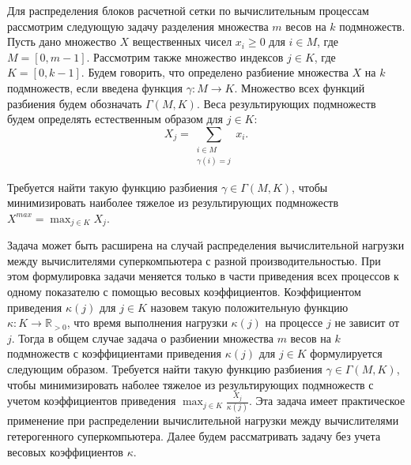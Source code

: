 Для распределения блоков расчетной сетки по вычислительным процессам рассмотрим следующую задачу разделения множества $m$ весов на $k$ подмножеств.
Пусть дано множество $X$ вещественных чисел $x_i \ge 0$ для $i \in M$, где $M = [0, m - 1]$.
Рассмотрим также множество индексов $j \in K$, где $K = [0, k - 1]$.
Будем говорить, что определено разбиение множества $X$ на $k$ подмножеств, если введена функция $\gamma: M \rightarrow K$.
Множество всех функций разбиения будем обозначать $\Gamma(M, K)$.
Веса результирующих подмножеств будем определять естественным образом для $j \in K$:
\begin{equation}
	X_j = \sum_{\substack{i \in M \\ \gamma(i) = j}}{x_i}.
\end{equation}

Требуется найти такую функцию разбиения $\gamma \in \Gamma(M, K)$, чтобы минимизировать наиболее тяжелое из результирующих подмножеств $X^{max} = \max_{j \in K}{X_j}$.

Задача может быть расширена на случай распределения вычислительной нагрузки между вычислителями суперкомпьютера с разной производительностью.
При этом формулировка задачи меняется только в части приведения всех процессов к одному показателю с помощью весовых коэффициентов.
Коэффициентом приведения $\kappa(j)$ для $j \in K$ назовем такую положительную функцию $\kappa: K \rightarrow \mathbb{R}_{>0}$, что время выполнения нагрузки $\kappa(j)$ на процессе $j$ не зависит от $j$.
Тогда в общем случае задача о разбиении множества $m$ весов на $k$ подмножеств с коэффициентами приведения $\kappa(j)$ для $j \in K$ формулируется следующим образом.
Требуется найти такую функцию разбиения $\gamma \in \Gamma(M, K)$, чтобы минимизировать наболее тяжелое из результирующих подмножеств с учетом коэффициентов приведения $\max_{j \in K}{ \frac{X_j}{\kappa(j)} }$.
Эта задача имеет практическое применение при распределении вычислительной нагрузки между вычислителями гетерогенного суперкомпьютера.
Далее будем рассматривать задачу без учета весовых коэффициентов $\kappa$.

